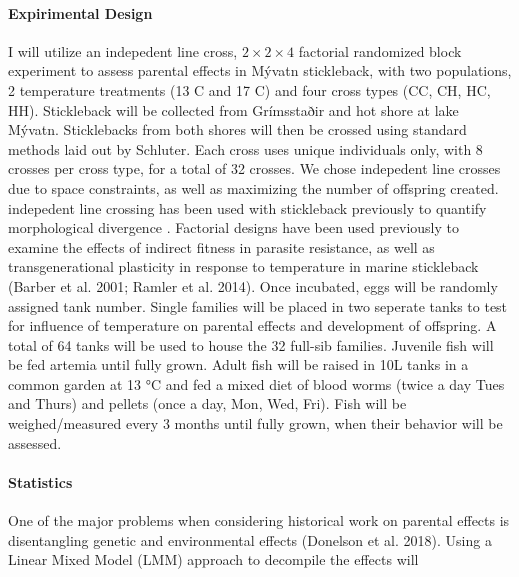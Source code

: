 \documentclass[12pt]{extarticle}
\begin{document}
\paragraph{Expirimental Design}
I will utilize an indepedent line cross, $2 \times 2 \times 4$ factorial randomized block experiment to assess parental effects in Mývatn stickleback, with two populations, 2 temperature treatments (13 \degree C and 17 \degree C) and four cross types (CC, CH, HC, HH). Stickleback will be collected from Grímsstaðir and hot shore at lake M\'yvatn. Sticklebacks from both shores will then be crossed using standard methods laid out by Schluter. Each cross uses unique individuals only, with 8 crosses per cross type, for a total of 32 crosses. We chose indepedent line crosses due to space constraints, as well as maximizing the number of offspring created. indepedent line crossing has been used with stickleback previously to quantify morphological divergence \citep{Berner2011}. Factorial designs have been used previously to examine the effects of indirect fitness in parasite resistance, as well as transgenerational plasticity in response to temperature in marine stickleback (Barber et al. 2001; Ramler et al. 2014). Once incubated, eggs will be randomly assigned tank number. Single families will be placed in two seperate tanks to test for influence of temperature on parental effects and development of offspring. A total of 64 tanks will be used to house the 32 full-sib families. Juvenile fish will be fed artemia until fully grown. Adult fish will be raised in 10L tanks in a common garden at 13 °C and fed a mixed diet of blood worms (twice a day Tues and Thurs) and pellets (once a day, Mon, Wed, Fri). Fish will be weighed/measured every 3 months until fully grown, when their behavior will be assessed. 


\paragraph{Statistics} One of the major problems when considering historical work on parental effects is disentangling genetic and environmental effects (Donelson et al. 2018). Using a Linear Mixed Model (LMM) approach to decompile the effects will 
\end{document}
